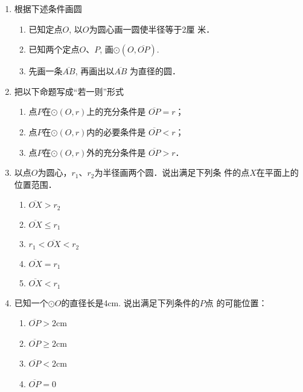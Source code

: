 \begin{ex}
\begin{enumerate}
    \item 根据下述条件画圆
\begin{enumerate}
\item 已知定点$O$, 以$O$为圆心画一圆使半径等于2厘
米．
\item 已知两个定点$O$、$P$, 画$\odot(O,\overline{OP})$.
\item 先画一条$\overline{AB}$, 再画出以$\overline{AB}$
为直径的圆．
\end{enumerate}

\item 把以下命题写成“若一则”形式
\begin{enumerate}
\item 点$P$在$\odot(O,r)$上的充分条件是
$\overline{OP}=r$；
\item 点$P$在$\odot(O,r)$内的必要条件是
$\overline{OP}<r$；
\item 点$P$在$\odot(O,r)$外的充分条件是
$\overline{OP}>r$．
\end{enumerate}


\item 以点$O$为圆心，$r_1$、$r_2$为半径画两个圆．说出满足下列条
件的点$X$在平面上的位置范围．
\begin{multicols}{2}
\begin{enumerate}
    \item $\overline{OX} >r_2$
    \item $\overline{OX} \le r_1$
    \item $r_1<\overline{OX}<r_2 $
    \item $\overline{OX}=r_1 $
    \item $\overline{OX}<r_1 $
\end{enumerate}
\end{multicols}

\item 已知一个$\odot O$的直径长是4cm. 说出满足下列条件的$P$点
的可能位置：
\begin{multicols}{2}
    \begin{enumerate}
        \item $\overline{OP} >2$cm
        \item $\overline{OP} \ge 2$cm
        \item $\overline{OP} <2$cm
        \item $\overline{OP} =0$
    \end{enumerate}
    \end{multicols}


\end{enumerate}
\end{ex}
